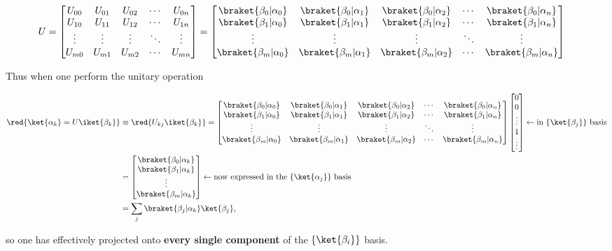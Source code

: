 \begin{equation}
\begin{aligned}
U & = \begin{bmatrix}
U_{00} & U_{01} & U_{02} & \cdots & U_{0n}\\
U_{10} & U_{11} & U_{12} & \cdots & U_{1n}\\
\vdots & \vdots & \vdots & \ddots & \vdots\\
U_{m0} & U_{m1} & U_{m2} & \cdots & U_{mn}
\end{bmatrix}
= \begin{bmatrix}
\braket{\beta_0|\alpha_0} & \braket{\beta_0|\alpha_1} & \braket{\beta_0|\alpha_2} & \cdots & \braket{\beta_0|\alpha_n}\\
\braket{\beta_1|\alpha_0} & \braket{\beta_1|\alpha_1} & \braket{\beta_1|\alpha_2} & \cdots & \braket{\beta_1|\alpha_n}\\
\vdots & \vdots & \vdots & \ddots & \vdots\\
\braket{\beta_m|\alpha_0} & \braket{\beta_m|\alpha_1} & \braket{\beta_m|\alpha_2} & \cdots & \braket{\beta_m|\alpha_n}\\
\end{bmatrix}
\end{aligned}
\end{equation}

Thus when one perform the unitary operation

\begin{equation}
\begin{aligned}
\red{\ket{\alpha_k} = U\iket{\beta_k}} & \equiv \red{U_{kj}\iket{\beta_k}} = 
\begin{bmatrix}
\braket{\beta_0|\alpha_0} & \braket{\beta_0|\alpha_1} & \braket{\beta_0|\alpha_2} & \cdots & \braket{\beta_0|\alpha_n}\\
\braket{\beta_1|\alpha_0} & \braket{\beta_1|\alpha_1} & \braket{\beta_1|\alpha_2} & \cdots & \braket{\beta_1|\alpha_n}\\
\vdots & \vdots & \vdots & \ddots & \vdots\\
\braket{\beta_m|\alpha_0} & \braket{\beta_m|\alpha_1} & \braket{\beta_m|\alpha_2} & \cdots & \braket{\beta_m|\alpha_n}\\
\end{bmatrix} 
\left[ \begin{matrix}
0\\0\\\vdots\\ 1\\\vdots
\end{matrix}\right] \leftarrow \text{in $\left\lbrace \ket{\beta_j} \right\rbrace$ basis}\\
& = \begin{bmatrix}
\braket{\beta_0|\alpha_k} \\\braket{\beta_1|\alpha_k}\\\vdots\\\braket{\beta_m|\alpha_k}
\end{bmatrix}\leftarrow \text{now expressed in the $\left\lbrace \ket{\alpha_j} \right\rbrace$ basis}\\
& = \sum_j \braket{\beta_j|\alpha_k} \ket{\beta_j},
\end{aligned}
\end{equation}

so one has effectively projected  onto \textbf{every single component} of the $\left\lbrace \ket{\beta_i} \right\rbrace$ basis. 
\newpage 

